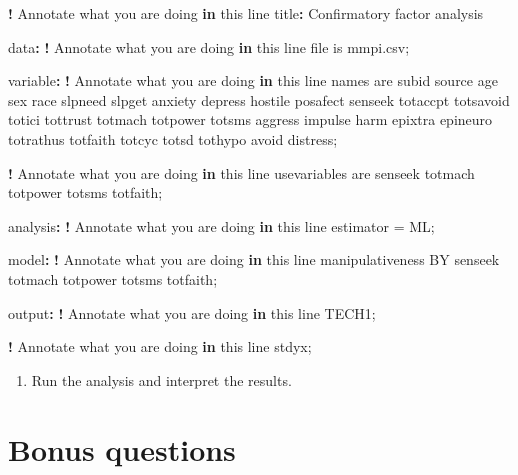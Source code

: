 \documentclass[
]{book}
\newenvironment{Shaded}{\begin{snugshade}}{\end{snugshade}}
\newcommand{\ControlFlowTok}[1]{\textcolor[rgb]{0.13,0.29,0.53}{\textbf{#1}}}
\newcommand{\NormalTok}[1]{#1}
\newcommand{\OtherTok}[1]{\textcolor[rgb]{0.56,0.35,0.01}{#1}}
\newcommand{\SpecialCharTok}[1]{\textcolor[rgb]{0.81,0.36,0.00}{\textbf{#1}}}
\providecommand{\tightlist}{%
  \setlength{\itemsep}{0pt}\setlength{\parskip}{0pt}}
\begin{document}
\begin{Shaded}
\begin{Highlighting}[]
\SpecialCharTok{!}\NormalTok{ Annotate what you are doing }\ControlFlowTok{in}\NormalTok{ this line}
\NormalTok{title}\SpecialCharTok{:}\NormalTok{ Confirmatory factor analysis}

\NormalTok{data}\SpecialCharTok{:}
\SpecialCharTok{!}\NormalTok{ Annotate what you are doing }\ControlFlowTok{in}\NormalTok{ this line}
\NormalTok{file is mmpi.csv;}

\NormalTok{variable}\SpecialCharTok{:}
\SpecialCharTok{!}\NormalTok{ Annotate what you are doing }\ControlFlowTok{in}\NormalTok{ this line}
\NormalTok{names are subid source age sex race slpneed slpget anxiety depress}
\NormalTok{hostile posafect senseek totaccpt totsavoid totici tottrust totmach}
\NormalTok{totpower totsms aggress impulse harm epixtra epineuro totrathus}
\NormalTok{totfaith totcyc totsd tothypo avoid distress;}

\SpecialCharTok{!}\NormalTok{ Annotate what you are doing }\ControlFlowTok{in}\NormalTok{ this line}
\NormalTok{usevariables are senseek totmach totpower totsms totfaith;}

\NormalTok{analysis}\SpecialCharTok{:}
\SpecialCharTok{!}\NormalTok{ Annotate what you are doing }\ControlFlowTok{in}\NormalTok{ this line}
\NormalTok{estimator }\OtherTok{=}\NormalTok{ ML;}

\NormalTok{model}\SpecialCharTok{:}
\SpecialCharTok{!}\NormalTok{ Annotate what you are doing }\ControlFlowTok{in}\NormalTok{ this line}
\NormalTok{manipulativeness BY senseek totmach totpower totsms totfaith;}

\NormalTok{output}\SpecialCharTok{:}
\SpecialCharTok{!}\NormalTok{ Annotate what you are doing }\ControlFlowTok{in}\NormalTok{ this line}
\NormalTok{TECH1;}

\SpecialCharTok{!}\NormalTok{ Annotate what you are doing }\ControlFlowTok{in}\NormalTok{ this line}
\NormalTok{stdyx;}
\end{Highlighting}
\end{Shaded}

\begin{enumerate}
\def\labelenumi{\arabic{enumi}.}
\setcounter{enumi}{2}
\tightlist
\item
  Run the analysis and interpret the results.
\end{enumerate}

\hypertarget{bonus-questions-1}{%
\section{Bonus questions}\label{bonus-questions-1}}
\end{document}
